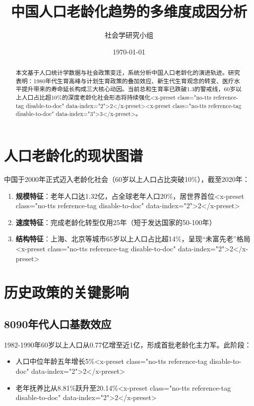 \documentclass[UTF8]{ctexart}
\title{中国人口老龄化趋势的多维度成因分析}
\author{社会学研究小组}
\date{\today}
\begin{document}
\maketitle
\pagestyle{plain}
\begin{abstract}
本文基于人口统计学数据与社会政策变迁，系统分析中国人口老龄化的演进轨迹。研究表明：1980年代生育高峰与计划生育政策的叠加效应、新生代生育观念的转变、医疗水平提升带来的寿命延长构成三大核心动因。当前总和生育率已跌破1.3的警戒线，60岁以上人口占比超10\%的深度老龄化社会形态将持续强化<x-preset class="no-tts reference-tag disable-to-doc" data-index="2">2</x-preset><x-preset class="no-tts reference-tag disable-to-doc" data-index="3">3</x-preset>。
\end{abstract}

\tableofcontents
\newpage

\section{人口老龄化的现状图谱}
中国于2000年正式迈入老龄化社会（60岁以上人口占比突破10\%），截至2020年：
\begin{enumerate}
  \item \textbf{规模特征}：老年人口达1.32亿，占全球老年人口20\%，居世界首位<x-preset class="no-tts reference-tag disable-to-doc" data-index="2">2</x-preset>
  \item \textbf{速度特征}：完成老龄化转型仅用25年（短于发达国家的50-100年）
  \item \textbf{结构特征}：上海、北京等城市65岁以上人口占比超14\%，呈现“未富先老”格局<x-preset class="no-tts reference-tag disable-to-doc" data-index="2">2</x-preset>
\end{enumerate}

\section{历史政策的关键影响}
\subsection{8090年代人口基数效应}
1982-1990年60岁以上人口从0.77亿增至近1亿，形成首批老龄化主力军。此阶段：
\begin{itemize}
  \item 人口中位年龄五年增长5\%<x-preset class="no-tts reference-tag disable-to-doc" data-index="2">2</x-preset>
  \item 老年抚养比从8.81\%跃升至20.14\%<x-preset class="no-tts reference-tag disable-to-doc" data-index="2">2</x-preset>
\end{itemize}
\end{document}
